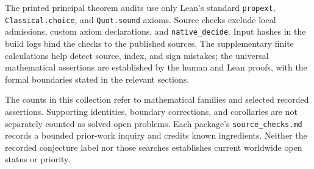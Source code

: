 \documentclass[11pt]{article}
\begin{document}
The printed principal theorem audits use only Lean's standard
\texttt{propext}, \texttt{Classical.choice}, and \texttt{Quot.sound}
axioms. Source checks exclude local admissions, custom axiom declarations,
and \texttt{native\_decide}. Input hashes in the build logs bind the
checks to the published sources. The supplementary finite calculations
help detect source, index, and sign mistakes; the universal mathematical
assertions are established by the human and Lean proofs, with the
formal boundaries stated in the relevant sections.

The counts in this collection refer to mathematical families and selected
recorded assertions. Supporting identities, boundary corrections, and
corollaries are not separately counted as solved open problems. Each
package's \texttt{source\_checks.md} records a bounded prior-work inquiry
and credits known ingredients. Neither the recorded conjecture label nor
those searches establishes current worldwide open status or priority.
\end{document}
